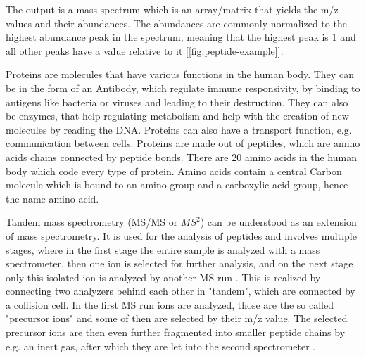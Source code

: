 \documentclass[11pt]{article}
\begin{document}
The output is a mass spectrum which is an array/matrix that yields the m/z values and their abundances. The abundances are commonly normalized to the highest abundance peak in the spectrum, meaning that the highest peak is 1 and all other peaks have a value relative to it [\cref{fig:peptide-example}]. 

Proteins are molecules that have various functions in the human body. They can be in the form of an Antibody, which regulate immune responsivity, by binding to antigens like bacteria or viruses and leading to their destruction. They can also be enzymes, that help regulating metabolism and help with the creation of new molecules by reading the DNA. Proteins can also have a transport function, e.g. communication between cells. Proteins are made out of peptides, which are amino acids chains connected by peptide bonds. There are 20 amino acids in the human body which code every type of protein. Amino acids contain a central Carbon molecule which is bound to an amino group and a carboxylic acid group, hence the name amino acid. 

Tandem mass spectrometry (MS/MS or \(MS^2\)) can be understood as an extension of mass spectrometry. It is used for the analysis of peptides and involves multiple stages, where in the first stage the entire sample is analyzed with a mass spectrometer, then one ion is selected for further analysis, and on the next stage only this isolated ion is analyzed by another MS run \cite{tandem-mass-spectrometry}. This is realized by connecting two analyzers behind each other in "tandem", which are connected by a collision cell. In the first MS run ions are analyzed, those are the so called "precursor ions" and some of then are selected by their m/z value. The selected precursor ions are then even further fragmented into smaller peptide chains by e.g. an inert gas, after which they are let into the second spectrometer \cite{tandem-mass-spec-deutsch, tandem-mass-spec-yt}.
\end{document}
